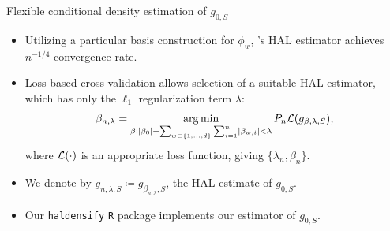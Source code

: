 \documentclass{beamer}
\begin{document}
\begin{frame}[c]{Flexible conditional density estimation of $g_{0,S}$}

\begin{center}
\begin{itemize}
  \itemsep8pt
  \item Utilizing a particular basis construction for $\phi_w$,
    \citet{vdl2017generally}'s HAL estimator achieves $n^{-1/4}$
    convergence rate\footnotemark.
  \item Loss-based cross-validation allows selection of a suitable HAL
    estimator, which has only the $\ell_1$ regularization term $\lambda$:
    {\small{
    \begin{equation*}
      \beta_{n, \lambda}= \operatorname*{arg\,min}_{\beta: \lvert \beta_0 \rvert + \sum_{w
        \subset\{1,\ldots,d\}} \sum_{i=1}^{n} \lvert \beta_{w,i} \rvert <
        \lambda} P_n \mathcal{L}(g_{\beta,\lambda,S}),
    \end{equation*} }
    }
    where $\mathcal{L}(\cdot)$ is an appropriate loss function, giving
    $\{\lambda_n, \beta_n\}$.
  \item We denote by $g_{n,\lambda,S} \coloneqq g_{\beta_{n, \lambda},S}$, the
    HAL estimate of $g_{0,S}$.
  \item Our \texttt{haldensify} \texttt{R} package implements our estimator of
    $g_{0,S}$.
\end{itemize}
\end{center}



\end{frame}


\end{document}
